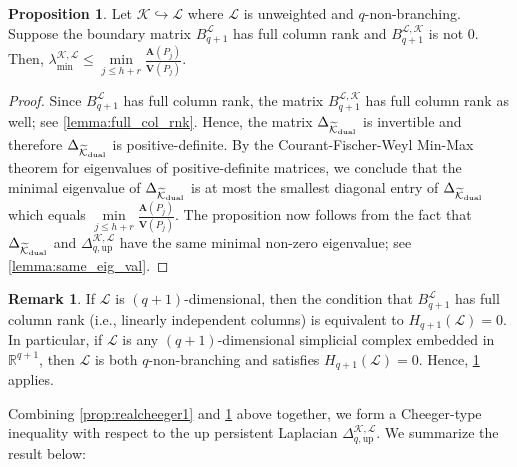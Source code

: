 \documentclass{article}
\theoremstyle{definition}
\newtheorem{remark}[theorem]{Remark}
\newtheorem{proposition}[theorem]{Proposition}
\newcommand{\KK}{\mathcal{K}}
\newcommand{\LL}{\mathcal{L}}
\begin{document}
\begin{proposition}\label{prop:realcheeger2}
Let $\KK\hookrightarrow \LL$ where $\LL$ is unweighted and $q$-non-branching. 
Suppose the boundary matrix $B_{q+1}^\LL$ has full column rank and $B_{q+1}^{\LL, \KK}$ is not $0$.
Then,
$
\lambda_{\mathrm{min}}^{\KK, \LL}\leq \min\limits_{j\leq h+r} \frac{\mathbf{A}(P_j)}{\mathbf{V}(P_j)}.
$
\end{proposition}

\begin{proof} 
Since $B_{q+1}^{\LL}$ has full column rank, the matrix $B_{q+1}^{\LL, \KK}$ has full column rank as well; see \cref{lemma:full_col_rnk}.
Hence, the matrix $\Delta_{\widetilde{\KK}_{\textrm{\textrm{dual}}}}$ is invertible 
and therefore $\Delta_{\widetilde{\KK}_{\textrm{\textrm{dual}}}}$ is positive-definite. By the Courant-Fischer-Weyl Min-Max theorem for eigenvalues of positive-definite matrices, we conclude that the minimal eigenvalue of $\Delta_{\widetilde{\KK}_{\textrm{\textrm{dual}}}}$ is at most 
the smallest diagonal entry of $\Delta_{\widetilde{\KK}_{\textrm{\textrm{dual}}}}$ which equals $\min\limits_{j\leq h+r} \frac{\mathbf{A}(P_j)}{\mathbf{V}(P_j)}$. The proposition now follows from the fact that 
$\Delta_{\widetilde{\KK}_{\textrm{\textrm{dual}}}}$ and $\Delta_{q, \mathrm{up}}^{\KK, \LL}$ have the same minimal non-zero eigenvalue; see \cref{lemma:same_eig_val}.
\end{proof}

\begin{remark}
If $\LL$ is $(q+1)$-dimensional, then the condition that $B_{q+1}^\LL$ has full column rank (i.e., linearly independent columns) is equivalent to $H_{q+1}(\LL) = 0$. In particular, if $\LL$ is any $(q+1)$-dimensional simplicial complex embedded in $\mathbb{R}^{q+1}$, then $\LL$ is both $q$-non-branching and satisfies $H_{q+1}(\LL) = 0$. Hence, \cref{prop:realcheeger2} applies. 
\end{remark}

Combining \cref{prop:realcheeger1} and \cref{prop:realcheeger2} above together,
we form a Cheeger-type inequality with respect to the up persistent Laplacian $\Delta_{q, \textrm{up}}^{\KK, \LL}$. 
We summarize the result below:
\end{document}
